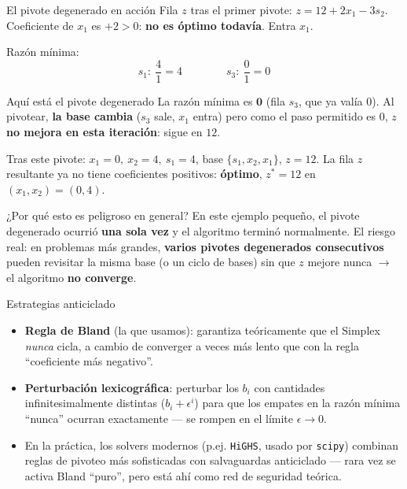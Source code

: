 \documentclass[aspectratio=169]{beamer}
\begin{document}
\begin{frame}{El pivote degenerado en acción}
Fila $z$ tras el primer pivote: $z=12+2x_1-3s_2$. Coeficiente de $x_1$ es $+2>0$: \textbf{no es óptimo todavía}. Entra $x_1$.

Razón mínima:
\[
s_1:\ \frac{4}{1}=4 \qquad\qquad s_3:\ \frac{0}{1}=0
\]
\par\medskip
\begin{alertblock}{Aquí está el pivote degenerado}
La razón mínima es $\mathbf{0}$ (fila $s_3$, que ya valía 0). Al pivotear, \textbf{la base cambia} ($s_3$ sale, $x_1$ entra) pero como el paso permitido es 0, \textbf{$z$ no mejora en esta iteración}: sigue en $12$.
\end{alertblock}

Tras este pivote: $x_1=0,\ x_2=4,\ s_1=4$, base $\{s_1,x_2,x_1\}$, $z=12$. La fila $z$ resultante ya no tiene coeficientes positivos: \textbf{óptimo}, $z^\ast=12$ en $(x_1,x_2)=(0,4)$.
\end{frame}

\begin{frame}{¿Por qué esto es peligroso en general?}
\small En este ejemplo pequeño, el pivote degenerado ocurrió \textbf{una sola vez} y el algoritmo terminó normalmente. El riesgo real: en problemas más grandes, \textbf{varios pivotes degenerados consecutivos} pueden revisitar la misma base (o un ciclo de bases) sin que $z$ mejore nunca $\to$ el algoritmo \textbf{no converge}.
\par\normalsize\medskip
\begin{block}{Estrategias anticiclado}
\small
\begin{itemize}
\item \textbf{Regla de Bland} (la que usamos): garantiza teóricamente que el Simplex \emph{nunca} cicla, a cambio de converger a veces más lento que con la regla ``coeficiente más negativo''.
\item \textbf{Perturbación lexicográfica}: perturbar los $b_i$ con cantidades infinitesimalmente distintas ($b_i+\epsilon^i$) para que los empates en la razón mínima ``nunca'' ocurran exactamente --- se rompen en el límite $\epsilon\to0$.
\item En la práctica, los solvers modernos (p.ej. \texttt{HiGHS}, usado por \texttt{scipy}) combinan reglas de pivoteo más sofisticadas con salvaguardas anticiclado --- rara vez se activa Bland ``puro'', pero está ahí como red de seguridad teórica.
\end{itemize}
\normalsize
\end{block}
\end{frame}
\end{document}
